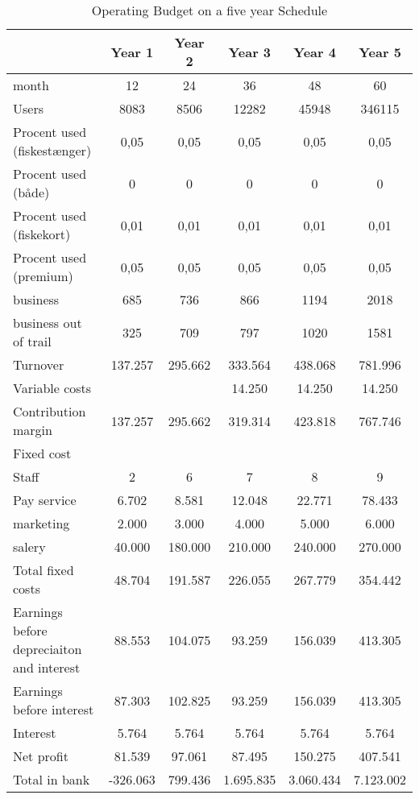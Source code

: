 \begin{table}[H]
\centering
\caption{Operating Budget on a five year Schedule}
\begin{tabular}{|l|c|c|c|c|c|}
\hline
 & Year 1 & Year 2 & Year 3 & Year 4 & Year 5 \\ \hline
month & 12 & 24 & 36 & 48 & 60 \\ \hline
Users & 8083 & 8506 & 12282 & 45948 & 346115 \\ \hline
Procent used (fiskestænger) & 0,05 & 0,05 & 0,05 & 0,05 & 0,05 \\ \hline
Procent used (både) & 0 & 0 & 0 & 0 & 0 \\ \hline
Procent used (fiskekort) & 0,01 & 0,01 & 0,01 & 0,01 & 0,01 \\ \hline
Procent used (premium) & 0,05 & 0,05 & 0,05 & 0,05 & 0,05 \\ \hline
business & 685 & 736 & 866 & 1194 & 2018 \\ \hline
business out of trail & 325 & 709 & 797 & 1020 & 1581 \\ \hline \hline
Turnover & 137.257 & 295.662 & 333.564 & 438.068 & 781.996 \\ \hline
Variable costs &  &  & 14.250 & 14.250 & 14.250 \\ \hline
Contribution margin & 137.257 & 295.662 & 319.314 & 423.818 & 767.746 \\ \hline \hline
\multicolumn{6}{|l|}{Fixed cost} \\ \hline
Staff & 2 & 6 & 7 & 8 & 9 \\ \hline
Pay service & 6.702 & 8.581 & 12.048 & 22.771 & 78.433 \\ \hline
marketing & 2.000 & 3.000 & 4.000 & 5.000 & 6.000 \\ \hline
salery & 40.000 & 180.000 & 210.000 & 240.000 & 270.000 \\ \hline
Total fixed costs & 48.704 & 191.587 & 226.055 & 267.779 & 354.442 \\ \hline \hline
Earnings before depreciaiton and interest & 88.553 & 104.075 & 93.259 & 156.039 & 413.305 \\ \hline \hline
Earnings before interest & 87.303 & 102.825 & 93.259 & 156.039 & 413.305 \\ \hline \hline
Interest & 5.764 & 5.764 & 5.764 & 5.764 & 5.764 \\ \hline \hline
Net profit & 81.539 & 97.061 & 87.495 & 150.275 & 407.541 \\ \hline
Total in bank & -326.063 & 799.436 & 1.695.835 & 3.060.434 & 7.123.002 \\ \hline
\end{tabular}
\end{table}